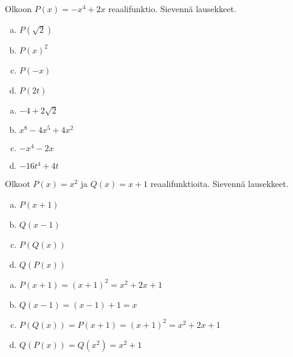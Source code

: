 \begin{tehtava}
    Olkoon $P(x)=-x^4+2x$ reaalifunktio. Sievennä lausekkeet.
    \begin{enumerate}[a)]
		\item $P(\sqrt{2})$
        \item $P(x)^2$
        \item $P(-x)$
        \item $P(2t)$
    \end{enumerate}
    \begin{vastaus}
        \begin{enumerate}[a)]
            \item $-4 + 2\sqrt{2}$
            \item $x^8 - 4x^5 + 4x^2$
            \item $-x^4-2x$
            \item $-16t^4+4t$
        \end{enumerate}
    \end{vastaus}
\end{tehtava}

\begin{tehtava}
    Olkoot $P(x)=x^2$ ja $Q(x)=x+1$ reaalifunktioita. Sievennä lausekkeet.
    \begin{enumerate}[a)]
        \item $P(x+1)$
        \item $Q(x-1)$
        \item $P(Q(x))$
        \item $Q(P(x))$
    \end{enumerate}
    \begin{vastaus}
        \begin{enumerate}[a)]
            \item $P(x+1) = (x+1)^2 = x^2+2x+1$
            \item $Q(x-1) = (x-1)+1 = x$
            \item $P(Q(x)) = P(x+1) = (x+1)^2 = x^2+2x+1$
            \item $Q(P(x)) = Q(x^2) = x^2+1$
        \end{enumerate}
    \end{vastaus}
\end{tehtava}
